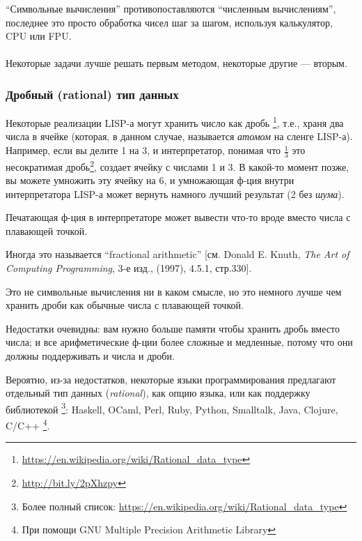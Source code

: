 ``Символьные вычисления'' противопоставляются ``численным вычислениям'', последнее это просто обработка чисел шаг за шагом,
используя калькулятор, \ac{CPU} или \ac{FPU}.\\
\\
Некоторые задачи лучше решать первым методом, некоторые другие --- вторым.

\subsubsection{Дробный (rational) тип данных}

Некоторые реализации LISP-а могут хранить число как дробь
\footnote{\url{https://en.wikipedia.org/wiki/Rational_data_type}}, т.е., храня два числа в ячейке (которая, в данном случае, называется \textit{атомом} на сленге LISP-а).
Например, если вы делите 1 на 3, и интерпретатор, понимая что $\frac{1}{3}$ это
несократимая дробь\footnote{\url{http://bit.ly/2pXhzpy}}, создает ячейку с числами 1 и 3.
В какой-то момент позже, вы можете умножить эту ячейку на 6, и умножающая ф-ция внутри интерпретатора LISP-а может вернуть
намного лучший результат (2 без \textit{шума}).

Печатающая ф-ция в интерпретаторе может вывести что-то вроде  вместо числа с плавающей точкой.

Иногда это называется ``fractional arithmetic'' [см. Donald E. Knuth, \textit{The Art of Computing Programming}, 3-е изд., (1997), 4.5.1, стр.330].

Это не символьные вычисления ни в каком смысле, но это немного лучше чем хранить дроби как обычные числа с плавающей точкой.

Недостатки очевидны: вам нужно больше памяти чтобы хранить дробь вместо числа;
и все арифметические ф-ции более сложные и медленные, потому что они должны поддерживать и числа и дроби.

Вероятно, из-за недостатков, некоторые языки программирования предлагают отдельный тип данных (\textit{rational}),
как опцию языка, или как поддержку библиотекой
\footnote{Более полный список: \url{https://en.wikipedia.org/wiki/Rational_data_type}}:
Haskell, OCaml, Perl, Ruby, Python, Smalltalk, Java, Clojure, C/C++
\footnote{При помощи GNU Multiple Precision Arithmetic Library}.

